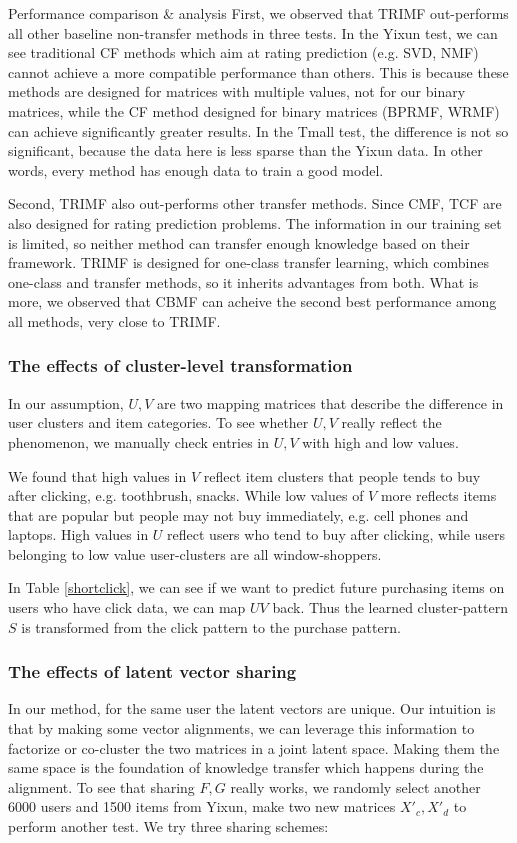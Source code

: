 \begin{subsection}{Performance comparison \& analysis}
First, we observed that TRIMF out-performs all other baseline non-transfer methods in three tests. In the Yixun test, we can see traditional CF methods which aim at rating prediction (e.g. SVD, NMF) cannot achieve a more compatible performance than others. This is because these methods are designed for matrices with multiple values, not for our binary matrices, while the CF method designed for binary matrices (BPRMF, WRMF) can achieve significantly greater results. In the Tmall test, the difference is not so significant, because the data here is less sparse than the Yixun data. In other words, every method has enough data to train a good model.

Second, TRIMF also out-performs other transfer methods. Since CMF, TCF are also designed for rating prediction problems. The information in our training set is limited, so neither method can transfer enough knowledge based on their framework. TRIMF is designed for one-class transfer learning, which combines one-class and transfer methods, so it inherits advantages from both. What is more, we observed that CBMF can acheive the second best performance among all methods, very close to TRIMF.


\subsubsection{The effects of cluster-level transformation}
In our assumption, $U,V$ are two mapping matrices that describe the difference in user clusters and item categories. To see whether $U,V$ really reflect the phenomenon, we manually check entries in $U,V$ with high and low values.

  We found that high values in $V$ reflect item clusters that people tends to buy after clicking, e.g. toothbrush, snacks. While low values of $V$ more reflects items that are popular but people may not buy immediately, e.g. cell phones and laptops. High values in $U$ reflect users who tend to buy after clicking, while users belonging to low value user-clusters are all window-shoppers.

  In Table \ref{shortclick}, we can see if we want to predict future purchasing items on users who have click data, we can map $UV$ back. Thus the learned cluster-pattern $S$ is transformed from the click pattern to the purchase pattern.

\subsubsection{The effects of latent vector sharing}
  	In our method, for the same user the latent vectors are unique. Our intuition is that by making some vector alignments, we can leverage this information to factorize or co-cluster the two matrices in a joint latent space. Making them the same space is the foundation of knowledge transfer which happens during the alignment.
    To see that sharing $F,G$ really works, we randomly select another 6000 users and 1500 items from Yixun, make two new matrices $X'_c, X'_d$ to perform another test. We try three sharing schemes: 
    

\end{subsection}
